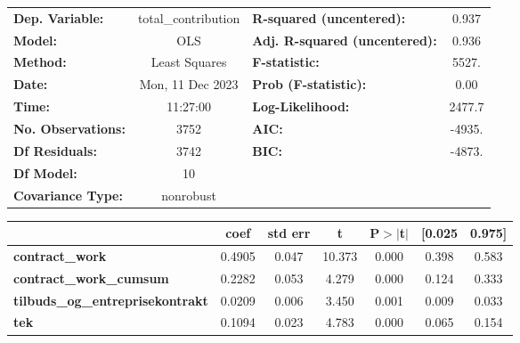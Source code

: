 \begin{center}
\begin{tabular}{lclc}
\toprule
\textbf{Dep. Variable:}                  & total\_contribution & \textbf{  R-squared (uncentered):}      &     0.937   \\
\textbf{Model:}                          &         OLS         & \textbf{  Adj. R-squared (uncentered):} &     0.936   \\
\textbf{Method:}                         &    Least Squares    & \textbf{  F-statistic:       }          &     5527.   \\
\textbf{Date:}                           &   Mon, 11 Dec 2023  & \textbf{  Prob (F-statistic):}          &     0.00    \\
\textbf{Time:}                           &       11:27:00      & \textbf{  Log-Likelihood:    }          &    2477.7   \\
\textbf{No. Observations:}               &          3752       & \textbf{  AIC:               }          &    -4935.   \\
\textbf{Df Residuals:}                   &          3742       & \textbf{  BIC:               }          &    -4873.   \\
\textbf{Df Model:}                       &            10       & \textbf{                     }          &             \\
\textbf{Covariance Type:}                &      nonrobust      & \textbf{                     }          &             \\
\bottomrule
\end{tabular}
\begin{tabular}{lcccccc}
                                         & \textbf{coef} & \textbf{std err} & \textbf{t} & \textbf{P$> |$t$|$} & \textbf{[0.025} & \textbf{0.975]}  \\
\midrule
\textbf{contract\_work}                  &       0.4905  &        0.047     &    10.373  &         0.000        &        0.398    &        0.583     \\
\textbf{contract\_work\_cumsum}          &       0.2282  &        0.053     &     4.279  &         0.000        &        0.124    &        0.333     \\
\textbf{tilbuds\_og\_entreprisekontrakt} &       0.0209  &        0.006     &     3.450  &         0.001        &        0.009    &        0.033     \\
\textbf{tek}                             &       0.1094  &        0.023     &     4.783  &         0.000        &        0.065    &        0.154     \\

\end{tabular}
\end{center}
